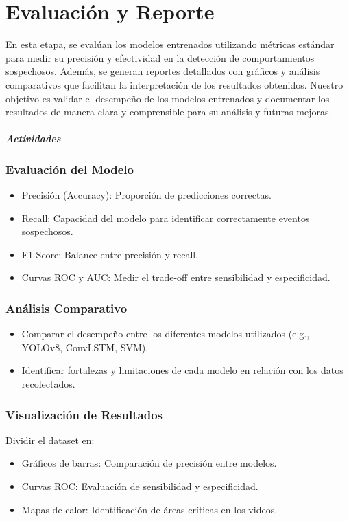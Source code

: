 \documentclass[listof=nochaptergap,12pt,times,authoryear]{report}
\begin{document}
\section{Evaluación y Reporte}
En esta etapa, se evalúan los modelos entrenados utilizando métricas estándar para medir su precisión y efectividad en la detección de comportamientos sospechosos. Además, se generan reportes detallados con gráficos y análisis comparativos que facilitan la interpretación de los resultados obtenidos.
Nuestro objetivo es validar el desempeño de los modelos entrenados y documentar los resultados de manera clara y comprensible para su análisis y futuras mejoras.



\paragraph{\textit{Actividades}}

\subsubsection{Evaluación del Modelo}

\begin{itemize}
    \item Precisión (Accuracy): Proporción de predicciones correctas.
    \item Recall: Capacidad del modelo para identificar correctamente eventos sospechosos.
    \item F1-Score: Balance entre precisión y recall.
    \item Curvas ROC y AUC: Medir el trade-off entre sensibilidad y especificidad.
\end{itemize}



\subsubsection{Análisis Comparativo}
\begin{itemize}
    \item Comparar el desempeño entre los diferentes modelos utilizados (e.g., YOLOv8, ConvLSTM, SVM).
    \item Identificar fortalezas y limitaciones de cada modelo en relación con los datos recolectados.
\end{itemize}



\subsubsection{Visualización de Resultados}
Dividir el dataset en:
\begin{itemize}
    \item Gráficos de barras: Comparación de precisión entre modelos.
    \item Curvas ROC: Evaluación de sensibilidad y especificidad.
    \item Mapas de calor: Identificación de áreas críticas en los videos.
\end{itemize}
\end{document}
